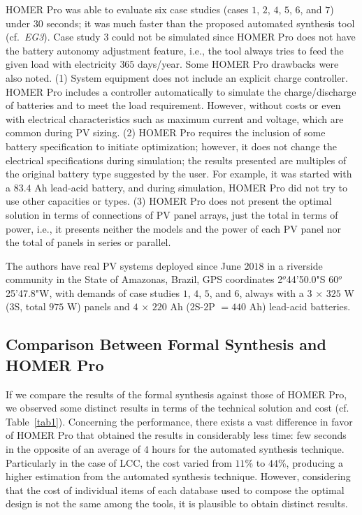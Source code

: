 \documentclass[runningheads]{llncs}
\begin{document}
HOMER Pro was able to evaluate six case studies (cases $1$, $2$, $4$, $5$, $6$, and $7$) under $30$ seconds; it was much faster than the proposed automated synthesis tool (cf.~\textit{EG3}). Case study $3$ could not be simulated since HOMER Pro does not have the battery autonomy adjustment feature, i.e., the tool always tries to feed the given load with electricity $365$ days/year. Some HOMER Pro drawbacks were also noted. (1) System equipment does not include an explicit charge controller. HOMER Pro includes a controller automatically to simulate the charge/discharge of batteries and to meet the load requirement. However, without costs or even with electrical characteristics such as maximum current and voltage, which are common during PV sizing. (2) HOMER Pro requires the inclusion of some battery specification to initiate optimization; however, it does not change the electrical specifications during simulation; the results presented are multiples of the original battery type suggested by the user. For example, it was started with a $83.4$ Ah lead-acid battery, and during simulation, HOMER Pro did not try to use other capacities or types. (3) HOMER Pro does not present the optimal solution in terms of connections of PV panel arrays, just the total in terms of power, i.e., it presents neither the models and the power of each PV panel nor the total of panels in series or parallel.

The authors have real PV systems deployed since June $2018$ in a riverside community in the State of Amazonas, Brazil, GPS coordinates 2$^{o}$44'50.0"S 60$^{o}$25'47.8"W, with demands of case studies $1$, $4$, $5$, and $6$, always with a $3$ $\times$ $325$ W ($3$S, total $975$ W) panels and $4$ $\times$ $220$ Ah ($2$S-$2$P $= 440$ Ah) lead-acid batteries.

\subsection{Comparison Between Formal Synthesis and HOMER Pro}
If we compare the results of the formal synthesis against those of HOMER Pro, we observed some distinct results in terms of the technical solution and cost (cf. Table~\ref{tab1}). Concerning the performance, there exists a vast difference in favor of HOMER Pro that obtained the results in considerably less time: few seconds in the opposite of an average of $4$ hours for the automated synthesis technique.
%
Particularly in the case of LCC, the cost varied from $11$\% to $44$\%, producing a higher estimation from the automated synthesis technique. However, considering that the cost of individual items of each database used to compose the optimal design is not the same among the tools, it is plausible to obtain distinct results.
\end{document}
